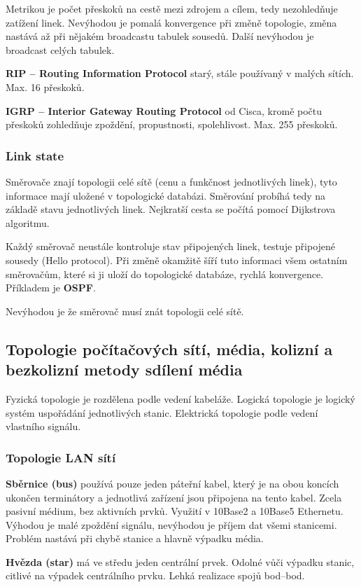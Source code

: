Metrikou je počet přeskoků na cestě mezi zdrojem a cílem, tedy nezohledňuje zatížení linek. Nevýhodou je pomalá konvergence při změně topologie, změna nastává až při nějakém broadcastu tabulek sousedů. Další nevýhodou je broadcast celých tabulek.

\textbf{RIP -- Routing Information Protocol} starý, stále používaný v malých sítích. Max. 16 přeskoků.

\textbf{IGRP -- Interior Gateway Routing Protocol} od Cisca, kromě počtu přeskoků zohledňuje zpoždění, propustnosti, spolehlivost. Max. 255 přeskoků.

\subsubsection{Link state}
Směrovače znají topologii celé sítě (cenu a funkčnost jednotlivých linek), tyto informace mají uložené v topologické databázi. Směrování probíhá tedy na základě stavu jednotlivých linek. Nejkratší cesta se počítá pomocí Dijkstrova algoritmu. 

Každý směrovač neustále kontroluje stav připojených linek, testuje připojené sousedy (Hello protocol). Při změně okamžitě šíří tuto informaci všem ostatním směrovačům, které si ji uloží do topologické databáze, rychlá konvergence. Příkladem je \textbf{OSPF}.

Nevýhodou je že směrovač musí znát topologii celé sítě.
\subsection{Topologie počítačových sítí, média, kolizní a bezkolizní metody sdílení média}
Fyzická topologie je rozdělena podle vedení kabeláže. Logická topologie je logický systém uspořádání jednotlivých stanic. Elektrická topologie podle vedení vlastního signálu.
\subsubsection{Topologie LAN sítí}
\textbf{Sběrnice (bus)} používá pouze jeden páteřní kabel, který je na obou koncích ukončen terminátory a jednotlivá zařízení jsou připojena na tento kabel. Zcela pasivní médium, bez aktivních prvků. Využití v 10Base2 a 10Base5 Ethernetu. Výhodou je malé zpoždění signálu, nevýhodou je příjem dat všemi stanicemi. Problém nastává při chybě stanice a hlavně výpadku média.

\textbf{Hvězda (star)} má ve středu jeden centrální prvek. Odolné vůči výpadku stanic, citlivé na výpadek centrálního prvku. Lehká realizace spojů bod--bod.


